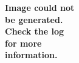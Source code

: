 \documentclass{article}
\begin{document}
\centering\bf\Large Image could not\\be generated.\\Check the log\\for more\\information.
\end{document}
